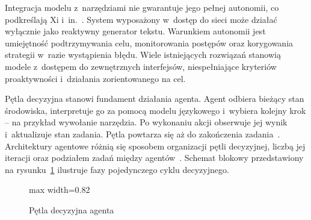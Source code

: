 Integracja modelu z~narzędziami nie gwarantuje jego pełnej autonomii, co
podkreślają Xi i~in.~\cite{xi2025rise}. System wyposażony w~dostęp do sieci
może działać wyłącznie jako reaktywny generator tekstu. Warunkiem autonomii
jest umiejętność podtrzymywania celu, monitorowania postępów oraz korygowania
strategii w~razie wystąpienia błędu. Wiele istniejących rozwiązań stanowią
modele z~dostępem do zewnętrznych interfejsów, niespełniające kryteriów
proaktywności i~działania zorientowanego na cel.

Pętla decyzyjna stanowi fundament działania agenta. Agent odbiera bieżący stan
środowiska, interpretuje go za pomocą modelu językowego i~wybiera kolejny krok
-- na przykład wywołanie narzędzia. Po wykonaniu akcji obserwuje jej wynik
i~aktualizuje stan zadania. Pętla powtarza się aż do zakończenia
zadania~\cite{yao2022react}. Architektury agentowe różnią się sposobem
organizacji pętli decyzyjnej, liczbą jej iteracji oraz podziałem zadań między
agentów~\cite{wang2024survey, xi2025rise}. Schemat blokowy przedstawiony na
rysunku~\ref{fig:petla-decyzyjna} ilustruje fazy pojedynczego cyklu
decyzyjnego.

\begin{figure}[H]
  \caption{Pętla decyzyjna agenta}\label{fig:petla-decyzyjna}
  \centering
  \begin{adjustbox}{max width=0.82\textwidth}
  \end{adjustbox}
\end{figure}

